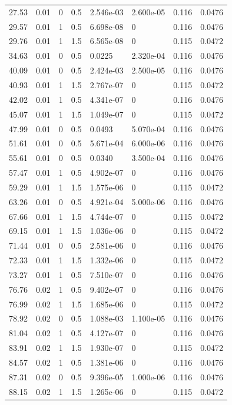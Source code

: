 \documentclass[preview]{standalone}
\begin{document}
{{\begin{tabular}{L{1.2cm}C{1.2cm} C{0.3cm}C{0.5cm} C{1.4cm}C{1.4cm} C{1.4cm}C{1.4cm}}
  27.53  &  0.01  & 0     & 0.5 &  2.546e-03  & 2.600e-05  & 0.116 &  0.0476   \\ 
  29.57  &  0.01  & 1     & 0.5 &  6.698e-08  & 0  & 0.116 &  0.0476   \\ 
  29.76  &  0.01  & 1     & 1.5 &  6.565e-08  & 0  & 0.115 &  0.0472   \\ 
  34.63  &  0.01  & 0     & 0.5 &  0.0225  & 2.320e-04  & 0.116 &  0.0476   \\ 
  40.09  &  0.01  & 0     & 0.5 &  2.424e-03  & 2.500e-05  & 0.116 &  0.0476   \\ 
  40.93  &  0.01  & 1     & 1.5 &  2.767e-07  & 0  & 0.115 &  0.0472   \\ 
  42.02  &  0.01  & 1     & 0.5 &  4.341e-07  & 0  & 0.116 &  0.0476   \\ 
  45.07  &  0.01  & 1     & 1.5 &  1.049e-07  & 0  & 0.115 &  0.0472   \\ 
  47.99  &  0.01  & 0     & 0.5 &  0.0493  & 5.070e-04  & 0.116 &  0.0476   \\ 
  51.61  &  0.01  & 0     & 0.5 &  5.671e-04  & 6.000e-06  & 0.116 &  0.0476   \\ 
  55.61  &  0.01  & 0     & 0.5 &  0.0340  & 3.500e-04  & 0.116 &  0.0476   \\ 
  57.47  &  0.01  & 1     & 0.5 &  4.902e-07  & 0  & 0.116 &  0.0476   \\ 
  59.29  &  0.01  & 1     & 1.5 &  1.575e-06  & 0  & 0.115 &  0.0472   \\ 
  63.26  &  0.01  & 0     & 0.5 &  4.921e-04  & 5.000e-06  & 0.116 &  0.0476   \\ 
  67.66  &  0.01  & 1     & 1.5 &  4.744e-07  & 0  & 0.115 &  0.0472   \\ 
  69.15  &  0.01  & 1     & 1.5 &  1.036e-06  & 0  & 0.115 &  0.0472   \\ 
  71.44  &  0.01  & 0     & 0.5 &  2.581e-06  & 0  & 0.116 &  0.0476   \\ 
  72.33  &  0.01  & 1     & 1.5 &  1.332e-06  & 0  & 0.115 &  0.0472   \\ 
  73.27  &  0.01  & 1     & 0.5 &  7.510e-07  & 0  & 0.116 &  0.0476   \\ 
  76.76  &  0.02  & 1     & 0.5 &  9.402e-07  & 0  & 0.116 &  0.0476   \\ 
  76.99  &  0.02  & 1     & 1.5 &  1.685e-06  & 0  & 0.115 &  0.0472   \\ 
  78.92  &  0.02  & 0     & 0.5 &  1.088e-03  & 1.100e-05  & 0.116 &  0.0476   \\ 
  81.04  &  0.02  & 1     & 0.5 &  4.127e-07  & 0  & 0.116 &  0.0476   \\ 
  83.91  &  0.02  & 1     & 1.5 &  1.930e-07  & 0  & 0.115 &  0.0472   \\ 
  84.57  &  0.02  & 1     & 0.5 &  1.381e-06  & 0  & 0.116 &  0.0476   \\ 
  87.31  &  0.02  & 0     & 0.5 &  9.396e-05  & 1.000e-06  & 0.116 &  0.0476   \\ 
  88.15  &  0.02  & 1     & 1.5 &  1.265e-06  & 0  & 0.115 &  0.0472   \\ 
\hline 
\end{tabular} 

}}
\end{document}
